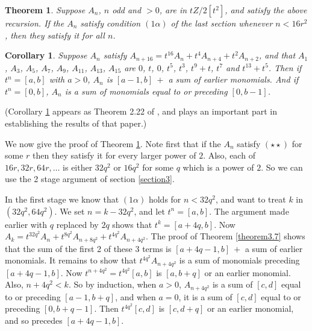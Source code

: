 \documentclass{monsky2009}
\newtheorem{theorem}[definition]{Theorem}
\newtheorem{corollary}[definition]{Corollary}
\begin{document}
\begin{theorem}
\label{theorem4.1}
Suppose $A_{n}$, $n$ odd and $>0$, are in $tZ/2[t^{2}]$, and satisfy the above recursion. If the $A_{n}$ satisfy condition $(1\alpha)$ of the last section whenever $n<16r^{2}$, then they satisfy it for all $n$.
\end{theorem}

\begin{corollary}%
\label{corollary4.2}
Suppose $A_{n}$ satisfy $A_{n+16}=t^{16}A_{n}+t^{4}A_{n+4}+t^{2}A_{n+2}$, and that $A_{1}$, $A_{3}$, $A_{5}$, $A_{7}$, $A_{9}$, $A_{11}$, $A_{13}$, $A_{15}$ are $0$, $t$, $0$, $t^{5}$, $t^{3}$, $t^{9}+t$, $t^{7}$ and $t^{13}+t^{5}$. Then if $t^{n}=[a,b]$ with $a>0$, $A_{n}$ is $[a-1,b]\ +$ a sum of earlier monomials. And if $t^{n}=[0,b]$, $A_{n}$ is a sum of monomials equal to or preceding $[0,b-1]$.
\end{corollary}

(Corollary \ref{corollary4.2} appears as Theorem 2.22 of \cite{2}, and plays an important part in establishing the results of that paper.)

We now give the proof of Theorem \ref{theorem4.1}. Note first that if the $A_{n}$ satisfy $(\star\star)$ for some $r$ then they satisfy it for every larger power of $2$. Also, each of $16r, 32r, 64r, \ldots $ is either $32q^{2}$ or $16q^{2}$ for some $q$ which is a power of $2$. So we can use the 2 stage argument of section \ref{section3}.

In the first stage we know that $(1\alpha)$ holds for $n<32q^{2}$, and want to treat $k$ in $(32q^{2},64q^{2})$. We set $n=k-32q^{2}$, and let $t^{n}=[a,b]$. The argument made earlier with $q$ replaced by $2q$ shows that $t^{k}=[a+4q,b]$. Now $A_{k}=t^{32q^{2}}A_{n}+t^{8q^{2}}A_{n+8q^{2}}+t^{4q^{2}}A_{n+4q^{2}}$. The proof of Theorem \ref{theorem3.7} shows that the sum of the first 2 of these 3 terms is $[a+4q-1,b]\ +$ a sum of earlier monomials. It remains to show that $t^{4q^{2}}A_{n+4q^{2}}$ is a sum of monomials preceding $[a+4q-1,b]$. Now $t^{n+4q^{2}}=t^{4q^{2}}[a,b]$ is $[a,b+q]$ or an earlier monomial. Also, $n+4q^{2}<k$. So by induction, when $a>0$, $A_{n+4q^{2}}$ is a sum of $[c,d]$ equal to or preceding $[a-1,b+q]$, and when $a=0$, it is a sum of $[c,d]$ equal to or preceding $[0,b+q-1]$. Then $t^{4q^{2}}[c,d]$ is $[c,d+q]$ or an earlier monomial, and so precedes $[a+4q-1,b]$.
\end{document}
